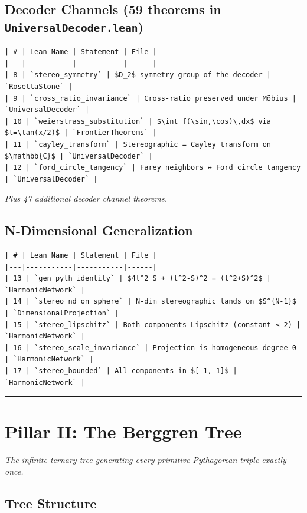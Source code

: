 \documentclass[12pt,a4paper,openany]{book}
\begin{document}
\subsection{Decoder Channels (59 theorems in \texttt{UniversalDecoder.lean})}

\begin{verbatim}
| # | Lean Name | Statement | File |
|---|-----------|-----------|------|
| 8 | `stereo_symmetry` | $D_2$ symmetry group of the decoder | `RosettaStone` |
| 9 | `cross_ratio_invariance` | Cross-ratio preserved under Möbius | `UniversalDecoder` |
| 10 | `weierstrass_substitution` | $\int f(\sin,\cos)\,dx$ via $t=\tan(x/2)$ | `FrontierTheorems` |
| 11 | `cayley_transform` | Stereographic = Cayley transform on $\mathbb{C}$ | `UniversalDecoder` |
| 12 | `ford_circle_tangency` | Farey neighbors ↔ Ford circle tangency | `UniversalDecoder` |
\end{verbatim}

\textit{Plus 47 additional decoder channel theorems.}

\subsection{N-Dimensional Generalization}

\begin{verbatim}
| # | Lean Name | Statement | File |
|---|-----------|-----------|------|
| 13 | `gen_pyth_identity` | $4t^2 S + (t^2-S)^2 = (t^2+S)^2$ | `HarmonicNetwork` |
| 14 | `stereo_nd_on_sphere` | N-dim stereographic lands on $S^{N-1}$ | `DimensionalProjection` |
| 15 | `stereo_lipschitz` | Both components Lipschitz (constant ≤ 2) | `HarmonicNetwork` |
| 16 | `stereo_scale_invariance` | Projection is homogeneous degree 0 | `HarmonicNetwork` |
| 17 | `stereo_bounded` | All components in $[-1, 1]$ | `HarmonicNetwork` |
\end{verbatim}

\bigskip\hrule\bigskip

\section{Pillar II: The Berggren Tree}

\textit{The infinite ternary tree generating every primitive Pythagorean triple exactly once.}

\subsection{Tree Structure}
\end{document}
